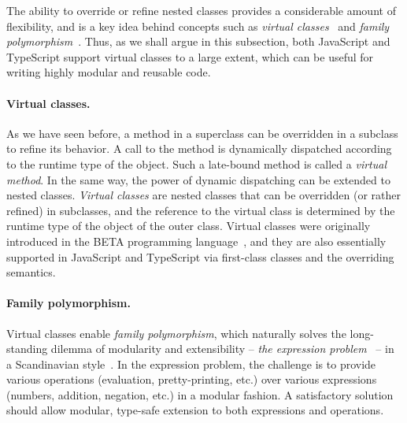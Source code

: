 The ability to override or refine nested classes provides a considerable amount
of flexibility, and is a key idea behind concepts such as \emph{virtual
classes}~\citep{madsen1989virtual,ernst2006virtual,clarke2007tribe} and
\emph{family
polymorphism}~\citep{ernst2001family,saito2008lightweight,zhang2017familia}.
Thus, as we shall argue in this subsection, both JavaScript and TypeScript
support virtual classes to a large extent, which can be useful for writing
highly modular and reusable code.

\paragraph{Virtual classes.}
As we have seen before, a method in a superclass can be overridden in a subclass
to refine its behavior. A call to the method is dynamically dispatched according
to the runtime type of the object. Such a late-bound method is called a
\emph{virtual method}. In the same way, the power of dynamic dispatching can be
extended to nested classes. \emph{Virtual classes} are nested classes that can
be overridden (or rather refined) in subclasses, and the reference to the
virtual class is determined by the runtime type of the object of the outer
class. Virtual classes were originally introduced in the BETA programming
language~\citep{madsen1993object}, and they are also essentially supported in
JavaScript and TypeScript via first-class classes and the overriding semantics.


\paragraph{Family polymorphism.}
Virtual classes enable \emph{family polymorphism}, which naturally solves the
long-standing dilemma of modularity and extensibility -- \emph{the expression
problem}~\citep{wadler1998expression} -- in a Scandinavian
style~\citep{ernst2004expression}. In the expression problem, the challenge is
to provide various operations (evaluation, pretty-printing, etc.) over various
expressions (numbers, addition, negation, etc.) in a modular fashion. A
satisfactory solution should allow modular, type-safe extension to both
expressions and operations.


